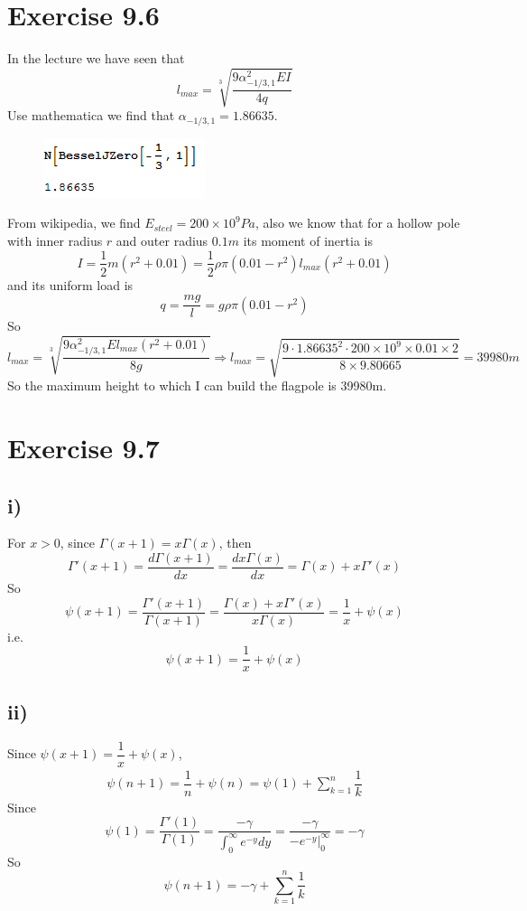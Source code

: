 \documentclass[a4paper,12pt,titlepage]{article}
\begin{document}
\section*{Exercise 9.6}
In the lecture we have seen that
$$l_{max}=\sqrt[3]{\dfrac{9\alpha_{-1/3,1}^2EI}{4q}}$$
Use mathematica we find that $\alpha_{-1/3,1}=1.86635$.
\begin{figure}[H]
    \centering
    \includegraphics[scale=1]{1.png}
\end{figure}
From wikipedia, we find $E_{steel}=200\times10^9Pa$, also we know that for a hollow pole with inner radius $r$ and outer radius $0.1m$ its moment of inertia is
$$I=\dfrac{1}{2}m(r^2+0.01)=\dfrac{1}{2}\rho\pi(0.01-r^2)l_{max}(r^2+0.01)$$
and its uniform load is
$$q=\dfrac{mg}{l}=g\rho\pi(0.01-r^2)$$
So
$$l_{max}=\sqrt[3]{\dfrac{9\alpha_{-1/3,1}^2El_{max}(r^2+0.01)}{8g}}\Rightarrow l_{max}=\sqrt{\dfrac{9\cdot 1.86635^2\cdot 200\times 10^9\times 0.01\times2}{8\times9.80665}}=39980m$$
So the maximum height to which I can build the flagpole is 39980m.


\section*{Exercise 9.7}

\subsection*{i)}
For $x>0$, since $\Gamma(x+1)=x\Gamma(x)$, then
$$\Gamma'(x+1)=\dfrac{d\Gamma(x+1)}{dx}=\dfrac{dx\Gamma(x)}{dx}=\Gamma(x)+x\Gamma'(x)$$
So
$$\psi(x+1)=\dfrac{\Gamma'(x+1)}{\Gamma(x+1)}=\dfrac{\Gamma(x)+x\Gamma'(x)}{x\Gamma(x)}=\dfrac{1}{x}+\psi(x)$$
i.e.
$$\psi(x+1)=\dfrac{1}{x}+\psi(x)$$

\subsection*{ii)}
Since $\psi(x+1)=\dfrac{1}{x}+\psi(x)$,
\begin{align*}
\psi(n+1)=\dfrac{1}{n}+\psi(n)=\psi(1)+\sum\limits_{k=1}^n\dfrac{1}{k}
\end{align*}
Since 
$$\psi(1)=\dfrac{\Gamma'(1)}{\Gamma(1)}=\dfrac{-\gamma}{\int_0^{\infty}e^{-y}dy}=\dfrac{-\gamma}{-e^{-y}|_0^{\infty}}=-\gamma$$
So
$$\psi(n+1)=-\gamma+\sum\limits_{k=1}^n\dfrac{1}{k}$$
\end{document}
